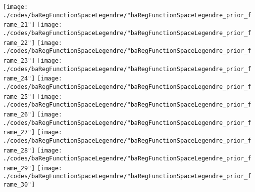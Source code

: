 \begin{frame}{\insertsection}
\begin{center}
{\begin{animateinline}{15}
				 \texttt{[image: ./codes/baRegFunctionSpaceLegendre/"baRegFunctionSpaceLegendre\_prior\_frame\_21"]}\newframe
				 \texttt{[image: ./codes/baRegFunctionSpaceLegendre/"baRegFunctionSpaceLegendre\_prior\_frame\_22"]}\newframe
				 \texttt{[image: ./codes/baRegFunctionSpaceLegendre/"baRegFunctionSpaceLegendre\_prior\_frame\_23"]}\newframe
				 \texttt{[image: ./codes/baRegFunctionSpaceLegendre/"baRegFunctionSpaceLegendre\_prior\_frame\_24"]}\newframe
				 \texttt{[image: ./codes/baRegFunctionSpaceLegendre/"baRegFunctionSpaceLegendre\_prior\_frame\_25"]}\newframe
				 \texttt{[image: ./codes/baRegFunctionSpaceLegendre/"baRegFunctionSpaceLegendre\_prior\_frame\_26"]}\newframe
				 \texttt{[image: ./codes/baRegFunctionSpaceLegendre/"baRegFunctionSpaceLegendre\_prior\_frame\_27"]}\newframe
				 \texttt{[image: ./codes/baRegFunctionSpaceLegendre/"baRegFunctionSpaceLegendre\_prior\_frame\_28"]}\newframe
				 \texttt{[image: ./codes/baRegFunctionSpaceLegendre/"baRegFunctionSpaceLegendre\_prior\_frame\_29"]}\newframe
				 \texttt{[image: ./codes/baRegFunctionSpaceLegendre/"baRegFunctionSpaceLegendre\_prior\_frame\_30"]}
			 \end{animateinline}
			}
	\end{center}
    
\end{frame}

